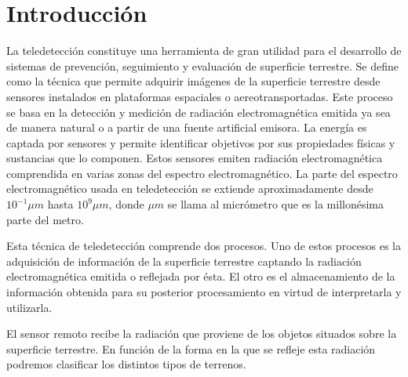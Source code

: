 
\chapter{Introducción}

La teledetección constituye una herramienta de gran utilidad para el desarrollo de sistemas de prevención, seguimiento y evaluación de superficie terrestre. Se define como  la  técnica  que  permite  adquirir  imágenes  de  la  superficie terrestre desde sensores instalados en plataformas espaciales o aereotransportadas. Este proceso se basa en la detección y medición de radiación electromagnética emitida ya sea de manera natural o a partir de una fuente artificial emisora. La energía es captada por sensores y permite identificar objetivos por sus propiedades físicas y sustancias que lo componen. Estos sensores emiten radiación electromagnética comprendida en varias zonas del espectro electromagnético. La parte del espectro electromagnético usada en teledetección se extiende aproximadamente desde $10^{-1} \mu m$ hasta $10^{9} \mu m$, donde $\mu m$ se llama al  micrómetro que es la millonésima parte del metro.

Esta técnica de teledetección comprende dos procesos. Uno de estos procesos es la adquisición de información de la superficie terrestre captando la radiación electromagnética emitida o reflejada por ésta. El otro es el almacenamiento de la información obtenida para su posterior procesamiento en virtud de interpretarla y utilizarla. 

El sensor remoto recibe la radiación que proviene de los objetos situados sobre la superficie terrestre. En función de la forma en la que se refleje esta radiación podremos clasificar los distintos tipos de terrenos.


